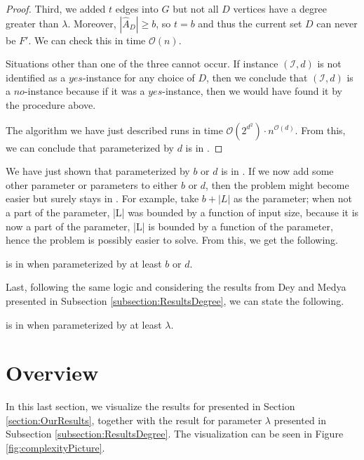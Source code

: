 \begin{proof}
    Third, we added $t$ edges into $G$ but not all $D$ vertices have a degree greater than $\lambda$.
    Moreover, $|\hat{A}_D| \geq b$, so $t = b$ and thus the current set $D$ can never be $F'$.
    We can check this in time $\mathcal{O}(n)$.

    Situations other than one of the three cannot occur.
    If instance $(\mathcal{I}, d)$ is not identified as a $yes$-instance for any choice of $D$,
    then we conclude that $(\mathcal{I}, d)$ is a $no$-instance because if it was a $yes$-instance,
    then we would have found it by the procedure above.
    
    The algorithm we have just described runs in time $\mathcal{O}(2^{d^2}) \cdot n^{\mathcal{O}(d)}$.
    From this, we can conclude that \HL parameterized by $d$ is in \XP.
\end{proof}

We have just shown that \HL parameterized by $b$ or $d$ is in \XP.
If we now add some other parameter or parameters to either $b$ or $d$, then the problem
might become easier but surely stays in \XP.
For example, take $b+|L|$ as the parameter;
when not a part of the parameter, |L| was bounded by a function of input size,
because it is now a part of the parameter, |L| is bounded by a function of the parameter,
hence the problem is possibly easier to solve.
From this, we get the following.

\begin{corollary}\label{cor:BD:variation:XP}
    \HL is in \XP when parameterized by at least $b$ or $d$.
\end{corollary}

Last, following the same logic and considering the results from Dey and Medya \cite{Dey2019} presented in Subsection \ref{subsection:ResultsDegree},
we can state the following.

\begin{corollary}\label{cor:Ld:variation:FPT}
    \HL is in \XP when parameterized by at least $\lambda$.
\end{corollary}

\section{Overview}

In this last section, we visualize the results for \HLdeg presented in Section \ref{section:OurResults},
together with the result for parameter $\lambda$ presented in Subsection \ref{subsection:ResultsDegree}.
The visualization can be seen in Figure \ref{fig:complexityPicture}.

